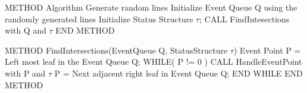 \noindent
METHOD Algorithm
    \newline \hspace*{2em}Generate random lines
    \newline \hspace*{2em}Initialize Event Queue Q using the randomly generated lines
    \newline \hspace*{2em}Initialize Status Structure $\tau$;
    \newline \newline \hspace*{2em}CALL FindIntesections with Q and $\tau$
\newline END METHOD

\noindent
\newline METHOD FindIntersections(EventQueue Q, StatusStructure $\tau$)
    \newline \hspace*{2em} Event Point P = Left most leaf in the Event Queue Q;
    \newline \hspace*{2em} WHILE( P != 0 )
        \newline \hspace*{4em} CALL HandleEventPoint with P and $\tau$
        \newline \hspace*{4em} P = Next adjacent right leaf in Event Queue Q;
    \newline \hspace*{2em} END WHILE
\newline END METHOD \newline

